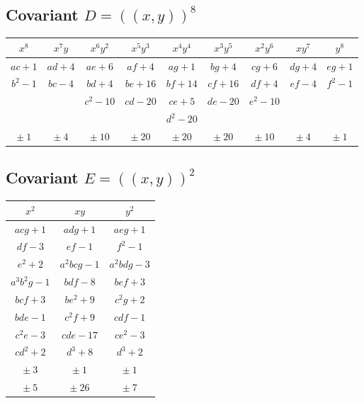 \documentclass[11pt,a4paper]{article}
\theoremstyle{cayley}
\begin{document}
\subsection*{Covariant $D = (\!\!(x,y)\!\!)^{8}$}

\begin{center}
\begin{tabular}{|c|c|c|c|c|c|c|c|c|}
\hline
$x^{8}$ & $x^{7}y$ & $x^{6}y^{2}$ & $x^{5}y^{3}$ & $x^{4}y^{4}$ & $x^{3}y^{5}$ & $x^{2}y^{6}$ & $xy^{7}$ & $y^{8}$ \\
\hline
$ac+1$ & $ad+4$ & $ae+6$ & $af+4$ & $ag+1$ & $bg+4$ & $cg+6$ & $dg+4$ & $eg+1$ \\
$b^{2}-1$ & $bc-4$ & $bd+4$ & $be+16$ & $bf+14$ & $cf+16$ & $df+4$ & $ef-4$ & $f^{2}-1$ \\
 &  & $c^{2}-10$ & $cd-20$ & $ce+5$ & $de-20$ & $e^{2}-10$ &  &  \\
 &  &  &  & $d^{2}-20$ &  &  &  &  \\
\hline
$\pm\ 1$ & $\pm\ 4$ & $\pm\ 10$ & $\pm\ 20$ & $\pm\ 20$ & $\pm\ 20$ & $\pm\ 10$ & $\pm\ 4$ & $\pm\ 1$ \\
\hline
\end{tabular}
\end{center}

\subsection*{Covariant $E = (\!\!(x,y)\!\!)^{2}$}

\begin{center}
\begin{tabular}{|c|c|c|}
\hline
$x^{2}$ & $xy$ & $y^{2}$ \\
\hline
$acg+1$ & $adg+1$ & $aeg+1$ \\
$df-3$ & $ef-1$ & $f^{2}-1$ \\
$e^{2}+2$ & $a^{2}bcg-1$ & $a^{2}bdg-3$ \\
$a^{3}b^{2}g-1$ & $bdf-8$ & $bef+3$ \\
$bcf+3$ & $be^{2}+9$ & $c^{2}g+2$ \\
$bde-1$ & $c^{2}f+9$ & $cdf-1$ \\
$c^{2}e-3$ & $cde-17$ & $ce^{2}-3$ \\
$cd^{2}+2$ & $d^{3}+8$ & $d^{3}+2$ \\
\hline
$\pm\ 3$ & $\pm\ 1$ & $\pm\ 1$ \\
$\pm\ 5$ & $\pm\ 26$ & $\pm\ 7$ \\
\hline
\end{tabular}
\end{center}
\end{document}
